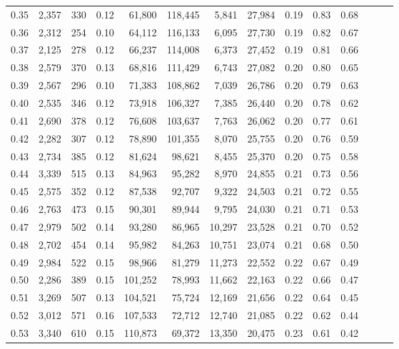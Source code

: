 \begin{tabular}{rrrrrrrrrrrrrr}
0.35 &  2,357 &  330 &  0.12 &   61,800 &  118,445 &   5,841 &  27,984 &  0.19 &  0.83 &      0.68 \\
0.36 &  2,312 &  254 &  0.10 &   64,112 &  116,133 &   6,095 &  27,730 &  0.19 &  0.82 &      0.67 \\
0.37 &  2,125 &  278 &  0.12 &   66,237 &  114,008 &   6,373 &  27,452 &  0.19 &  0.81 &      0.66 \\
0.38 &  2,579 &  370 &  0.13 &   68,816 &  111,429 &   6,743 &  27,082 &  0.20 &  0.80 &      0.65 \\
0.39 &  2,567 &  296 &  0.10 &   71,383 &  108,862 &   7,039 &  26,786 &  0.20 &  0.79 &      0.63 \\
0.40 &  2,535 &  346 &  0.12 &   73,918 &  106,327 &   7,385 &  26,440 &  0.20 &  0.78 &      0.62 \\
0.41 &  2,690 &  378 &  0.12 &   76,608 &  103,637 &   7,763 &  26,062 &  0.20 &  0.77 &      0.61 \\
0.42 &  2,282 &  307 &  0.12 &   78,890 &  101,355 &   8,070 &  25,755 &  0.20 &  0.76 &      0.59 \\
0.43 &  2,734 &  385 &  0.12 &   81,624 &   98,621 &   8,455 &  25,370 &  0.20 &  0.75 &      0.58 \\
0.44 &  3,339 &  515 &  0.13 &   84,963 &   95,282 &   8,970 &  24,855 &  0.21 &  0.73 &      0.56 \\
0.45 &  2,575 &  352 &  0.12 &   87,538 &   92,707 &   9,322 &  24,503 &  0.21 &  0.72 &      0.55 \\
0.46 &  2,763 &  473 &  0.15 &   90,301 &   89,944 &   9,795 &  24,030 &  0.21 &  0.71 &      0.53 \\
0.47 &  2,979 &  502 &  0.14 &   93,280 &   86,965 &  10,297 &  23,528 &  0.21 &  0.70 &      0.52 \\
0.48 &  2,702 &  454 &  0.14 &   95,982 &   84,263 &  10,751 &  23,074 &  0.21 &  0.68 &      0.50 \\
0.49 &  2,984 &  522 &  0.15 &   98,966 &   81,279 &  11,273 &  22,552 &  0.22 &  0.67 &      0.49 \\
0.50 &  2,286 &  389 &  0.15 &  101,252 &   78,993 &  11,662 &  22,163 &  0.22 &  0.66 &      0.47 \\
0.51 &  3,269 &  507 &  0.13 &  104,521 &   75,724 &  12,169 &  21,656 &  0.22 &  0.64 &      0.45 \\
0.52 &  3,012 &  571 &  0.16 &  107,533 &   72,712 &  12,740 &  21,085 &  0.22 &  0.62 &      0.44 \\
0.53 &  3,340 &  610 &  0.15 &  110,873 &   69,372 &  13,350 &  20,475 &  0.23 &  0.61 &      0.42 \\

\end{tabular}
